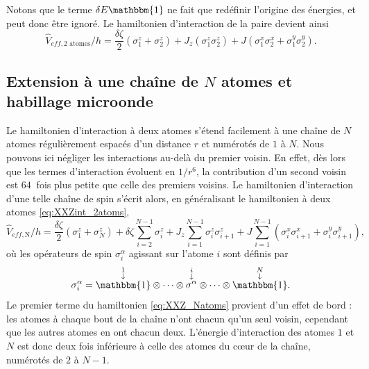 %
Notons que le terme $\delta E \mathbbm{1}$ ne fait que redéfinir l'origine des énergies, et peut donc être ignoré.
Le hamiltonien d'interaction de la paire devient ainsi
\begin{equation}
\label{eq:XXZint_2atoms}
\hat{V}_{eff,\text{2 atomes}}/h = \frac{\delta\zeta}{2}\left( \sigma_1^z + \sigma_2^z \right)
+ J_z\left( \sigma_1^z \sigma_2^z \right)
+ J \left( \sigma_1^x \sigma_2^x + \sigma_1^y \sigma_2^y \right).
\end{equation}

	\subsection{Extension à une chaîne de $N$ atomes et habillage microonde}
\noindent Le hamiltonien d'interaction à deux atomes s'étend facilement à une chaîne de $N$ atomes régulièrement espacés d'un distance $r$ et numérotés de $1$ à $N$.
Nous pouvons ici négliger les interactions au-delà du premier voisin.
En effet, dès lors que les termes d'interaction évoluent en $1/r^6$, la contribution d'un second voisin est $\SI{64}{}$ fois plus petite que celle des premiers voisins.
Le hamiltonien d'interaction d'une telle chaîne de spin s'écrit alors, en généralisant le hamiltonien à deux atomes \eqref{eq:XXZint_2atoms},
%
\begin{equation}
\label{eq:XXZint_Natoms}
\hat{V}_{eff,\text{N}}/h =
\frac{\delta\zeta}{2} \left( \sigma_1^z + \sigma_N^z \right)
+ \delta\zeta \sum_{i=2}^{N-1} \sigma_i^z
+ J_z \sum_{i=1}^{N-1} \sigma_i^z \sigma_{i+1}^z
+ J \sum_{i=1}^{N-1} \left( \sigma_i^x \sigma_{i+1}^x + \sigma_i^y \sigma_{i+1}^y \right) ,
\end{equation}
%
où les opérateurs de spin $\sigma_i^\alpha$ agissant sur l'atome $i$ sont définis par
%
\begin{equation}
\label{eq:Pauli_Natoms}
\sigma_i^\alpha = \overset{\substack{1\\ \downarrow \\}}{\mathbbm{1}}
\otimes\dots\otimes \overset{\substack{i\\ \downarrow \\}}{\sigma^\alpha}
\otimes\dots\otimes \overset{\substack{N\\ \downarrow \\}}{\mathbbm{1}}.
\end{equation}
%
Le premier terme du hamiltonien \eqref{eq:XXZ_Natoms} provient d'un effet de bord :
les atomes à chaque bout de la chaîne n'ont chacun qu'un seul voisin, cependant que les autres atomes en ont chacun deux.
L'énergie d'interaction des atomes $1$ et $N$ est donc deux fois inférieure à celle des atomes du \og c\oe ur \fg{} de la chaîne, numérotés de $2$ à $N-1$.

